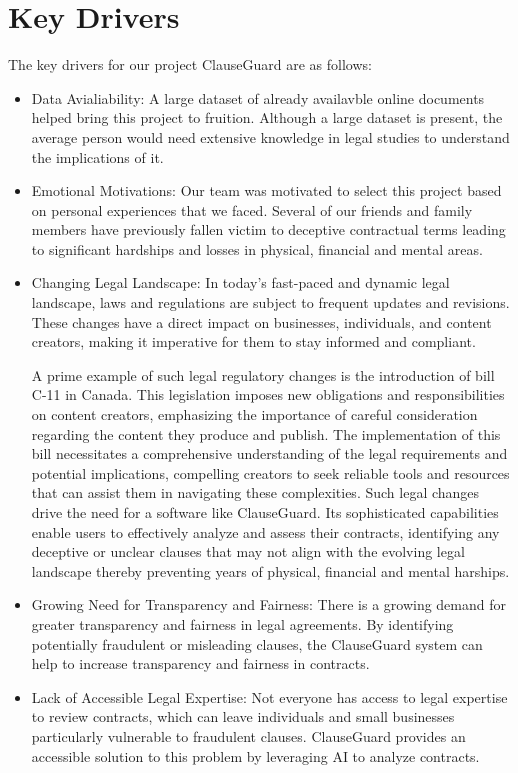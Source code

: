 \section{Key Drivers \label{Section::Key Drivers} }
The key drivers for our project ClauseGuard are as follows: 
\begin{itemize}
    \item Data Avialiability: A large dataset of already availavble online documents helped bring this project to fruition. Although a large dataset is present, the average person would need extensive knowledge in legal studies to understand the implications of it. 
    \item Emotional Motivations: Our team was motivated to select this project based on personal experiences that we faced. Several of our friends and family members have previously fallen victim to deceptive contractual terms leading to significant hardships and losses in physical, financial and mental areas. 
    \item Changing Legal Landscape: In today's fast-paced and dynamic legal landscape, laws and regulations are subject to frequent updates and revisions. These changes have a direct impact on businesses, individuals, and content creators, making it imperative for them to stay informed and compliant.

A prime example of such legal regulatory changes is the introduction of bill C-11 in Canada. This legislation imposes new obligations and responsibilities on content creators, emphasizing the importance of careful consideration regarding the content they produce and publish. The implementation of this bill necessitates a comprehensive understanding of the legal requirements and potential implications, compelling creators to seek reliable tools and resources that can assist them in navigating these complexities. 
Such legal changes drive the need for a software like ClauseGuard. Its sophisticated capabilities enable users to effectively analyze and assess their contracts, identifying any deceptive or unclear clauses that may not align with the evolving legal landscape thereby preventing years of physical, financial and mental harships.

\item Growing Need for Transparency and Fairness: There is a growing demand for greater transparency and fairness in legal agreements. By identifying potentially fraudulent or misleading clauses, the ClauseGuard system can help to increase transparency and fairness in contracts.

\item Lack of Accessible Legal Expertise: Not everyone has access to legal expertise to review contracts, which can leave individuals and small businesses particularly vulnerable to fraudulent clauses. ClauseGuard provides an accessible solution to this problem by leveraging AI to analyze contracts.
\end{itemize}



